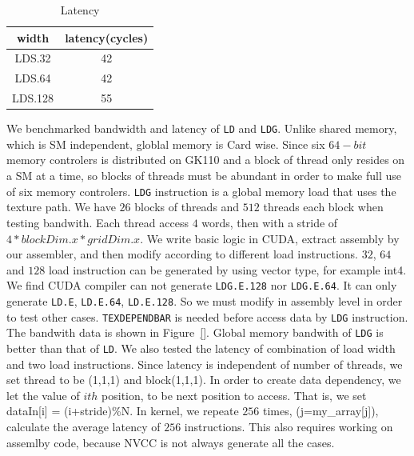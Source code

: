 \documentclass{sig-alternate-05-2015}
\begin{document}
\begin{table}[!t]
\caption{Latency}
\centering
\scalebox{1.0} {
\begin{tabular}{|c||c|}
    \hline
    width & latency(cycles) \\
\hline
    LDS.32 & 42\\
\hline
    LDS.64 & 42\\
\hline
    LDS.128 & 55\\
\hline
\end{tabular}
}
\label{tab:reg}
\end{table}
We benchmarked bandwidth and latency of {\tt LD}  and {\tt LDG}. Unlike shared memory, which is SM independent, globlal
memory is Card wise. Since six $64-bit$ memory controlers is distributed on
GK110 and a block of thread only resides on a SM at a time, so blocks of threads must be abundant in order to make full use of six memory controlers.
{\tt LDG} instruction is a global memory load that uses the texture path.
We have $26$ blocks of threads and $512$ threads each block when testing bandwith. Each thread access $4$ words, then
with a stride of $4*blockDim.x*gridDim.x$. We write basic logic in CUDA, extract assembly by our assembler, and then
modify according to different load instructions. $32$, $64$ and $128$ load instruction can be generated by using vector
type, for example int4. We find CUDA compiler can not generate {\tt LDG.E.128} nor {\tt LDG.E.64}. It can only generate
{\tt LD.E}, {\tt LD.E.64}, {\tt LD.E.128}. So we must modify in assembly level in order to test other cases.
{\tt TEXDEPENDBAR} is needed before access data by {\tt LDG} instruction. The bandwith data is shown in Figure~\ref{}.
Global memory bandwith of {\tt LDG} is better than that of {\tt LD}.
We also tested the latency of combination of load width and two load instructions.
Since latency is independent of number of threads, we set thread to be (1,1,1) and block(1,1,1).
In order to create data dependency, we let the value of $ith$ position, to be next position to access. That is, we set
dataIn[i] = (i+stride)\%N. In kernel, we  repeate $256$ times, (j=my\_array[j]), calculate the average latency of $256$ instructions.
This also requires working on assemlby code, because NVCC is not always generate all the cases.
\end{document}

